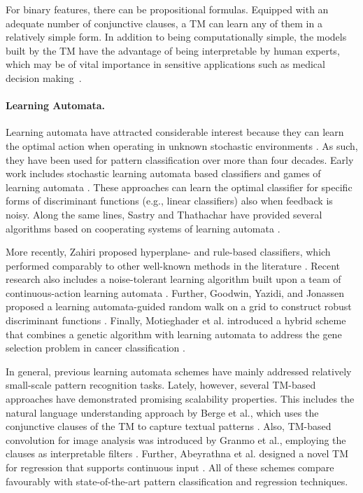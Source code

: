 \documentclass[letterpaper]{article}
\begin{document}
For  binary features, there can be  propositional formulas. Equipped with an adequate number of conjunctive clauses, a TM can learn any of them in a relatively simple form. In addition to being computationally simple, the models built by the TM have the advantage of being interpretable by human experts, which may be of vital importance in sensitive applications such as medical decision making~\cite{berge2019,Rudin2019}.

\paragraph{Learning Automata.}
Learning automata have attracted considerable interest because they can learn the optimal action when operating in unknown stochastic environments \cite{thathachar1987learning}. As such, they have been used for pattern classification over more than four decades. Early work includes stochastic learning automata based classifiers and games of learning automata \cite{barto1985pattern,thathachar1987learning}. These approaches can learn the optimal classifier for specific forms of discriminant functions (e.g., linear classifiers) also when feedback is noisy. Along the same lines, Sastry and Thathachar have provided several algorithms based on cooperating systems of learning automata \cite{sastry1999learning}. 

More recently, Zahiri proposed hyperplane- and rule-based classifiers, which performed comparably to other well-known methods in the literature \cite{zahiri2008learning,zahiri2012classification}. Recent research also includes a noise-tolerant learning algorithm built upon a team of continuous-action learning automata \cite{sastry2009team}. Further, Goodwin, Yazidi, and Jonassen proposed a learning automata-guided random walk on a grid to construct robust discriminant functions \cite{goodwin2016distributed}. Finally, Motieghader et al. introduced a hybrid scheme that combines a genetic algorithm with learning automata to address the gene selection problem in cancer classification \cite{motieghader2017hybrid}. 

In general, previous learning automata schemes have mainly addressed relatively small-scale pattern recognition tasks. Lately, however, several TM-based approaches have demonstrated promising scalability properties. This includes the natural language understanding approach by Berge et al., which uses the conjunctive clauses of the TM to capture textual patterns \cite{berge2019}. Also, TM-based convolution for image analysis was introduced by Granmo et al., employing the clauses as interpretable filters \cite{granmo2019convtsetlin}. Further, Abeyrathna et al. designed a novel TM for regression \cite{abeyrathna2019regressiontsetlin} that supports continuous input \cite{abeyrathna2019scheme}. All of these schemes compare favourably with state-of-the-art pattern classification and regression techniques.
\end{document}

